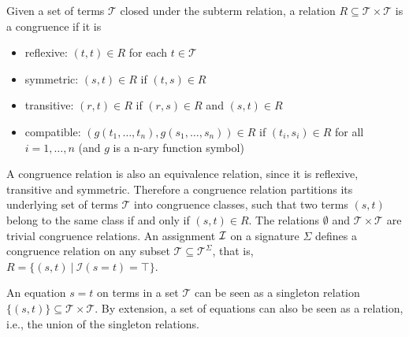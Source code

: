 \documentclass[smallextended]{svjour3}
\begin{document}
%
%
\begin{definition}  Given a set of terms $\mathcal{T}$ closed under the subterm relation, a relation $R \subseteq \mathcal{T} \times \mathcal{T}$ is a congruence if it is
\begin{itemize}
	\item reflexive: $(t,t) \in R$ for each $t \in \mathcal{T}$
	\item symmetric: $(s,t) \in R$ if $(t,s) \in R$
	\item transitive:  $(r,t) \in R$ if $(r,s) \in R$ and $(s,t) \in R$
	\item compatible: $(g(t_1,\ldots,t_n),g(s_1,\ldots,s_n)) \in R$ if $(t_i,s_i) \in R$  for all $i = 1,\ldots,n$ (and $g$ is a n-ary function symbol)
\end{itemize}

\end{definition}
\noindent A congruence relation is also an equivalence relation, since it is
reflexive, transitive and symmetric.  Therefore a congruence relation partitions
its underlying set of terms $\mathcal{T}$ into congruence classes, such that two
terms $(s,t)$ belong to the same class if and only if $(s,t) \in R$.  The
relations $\emptyset$ and $\mathcal{T} \times \mathcal{T}$ are trivial
congruence relations.  An assignment $\cal I$ on a signature $\Sigma$ defines a congruence relation on any subset $\mathcal{T}\subseteq\mathcal{T}^\Sigma$, that is, $R = \{(s,t) \ |\ \mathcal{I}(s = t) = \top \}$.

An equation $s = t$ on terms in a set $\mathcal{T}$ can be seen as a singleton relation $\{(s,t)\} \subseteq \mathcal{T} \times \mathcal{T}$.  By extension, a set of equations can also be seen as a relation, i.e., the union of the singleton relations.  
\end{document}
